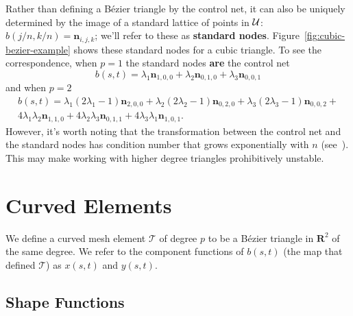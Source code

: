 \noindent Rather than defining a B\'{e}zier triangle by the control net, it can
also be uniquely determined by the image of a standard lattice of
points in \(\mathcal{U}\): \(b\left(j/n, k/n\right) = \mathbf{n}_{i, j, k}\);
we'll refer to these as \textbf{standard nodes}.
Figure~\ref{fig:cubic-bezier-example} shows these standard nodes for
a cubic triangle. To see the correspondence,
when \(p = 1\) the standard nodes \textbf{are} the control net
\begin{equation}
b(s, t) = \lambda_1 \mathbf{n}_{1, 0, 0} +
\lambda_2 \mathbf{n}_{0, 1, 0} + \lambda_3 \mathbf{n}_{0, 0, 1}
\end{equation}
and when \(p = 2\)
\begin{multline}
b(s, t) = \lambda_1\left(2 \lambda_1 - 1\right) \mathbf{n}_{2, 0, 0} +
\lambda_2\left(2 \lambda_2 - 1\right) \mathbf{n}_{0, 2, 0} +
\lambda_3\left(2 \lambda_3 - 1\right) \mathbf{n}_{0, 0, 2} + \\
4 \lambda_1 \lambda_2 \mathbf{n}_{1, 1, 0} +
4 \lambda_2 \lambda_3 \mathbf{n}_{0, 1, 1} +
4 \lambda_3 \lambda_1 \mathbf{n}_{1, 0, 1}.
\end{multline}
However, it's worth noting that the transformation between
the control net and the standard nodes has condition
number that grows exponentially with \(n\) (see~\cite{Farouki1991}).
This may make working with
higher degree triangles prohibitively unstable.

\section{Curved Elements}

We define a curved mesh element \(\mathcal{T}\) of degree \(p\)
to be a B\'{e}zier triangle in \(\mathbf{R}^2\) of the same degree.
We refer to the component functions of \(b(s, t)\) (the map that
defined \(\mathcal{T}\)) as \(x(s, t)\) and \(y(s, t)\).

\subsection{Shape Functions}

